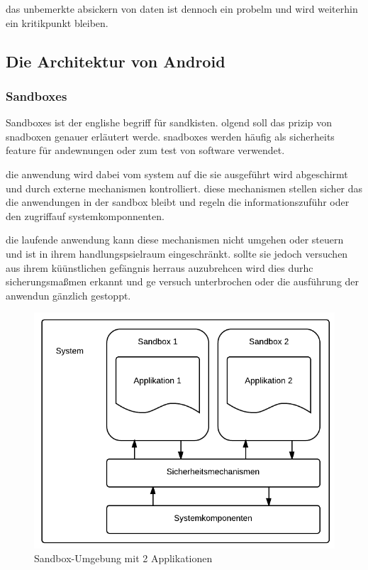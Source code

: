 das unbemerkte absickern von daten ist dennoch ein probelm und wird weiterhin ein kritikpunkt bleiben.


\subsection{Die Architektur von Android}
\subsubsection{Sandboxes}
\label{sandbox}
Sandboxes ist der englishe begriff für sandkisten. olgend soll das prizip von snadboxen genauer erläutert werde. snadboxes werden häufig als sicherheits feature für andewnungen oder zum test von software verwendet.

die anwendung wird dabei vom  system auf die sie ausgeführt wird abgeschirmt und durch externe mechanismen kontrolliert. diese mechanismen stellen sicher das die anwendungen in der sandbox bleibt und regeln die informationszuführ oder den zugriffauf systemkomponnenten.

die laufende anwendung kann diese mechanismen nicht umgehen oder steuern und ist in ihrem handlungspsielraum eingeschränkt. sollte sie jedoch versuchen aus ihrem küünstlichen gefängnis herraus auzubrehcen wird dies durhc sicherungsmaßmen erkannt und ge versuch unterbrochen oder die ausführung der anwendun gänzlich gestoppt.

\begin{center}
\begin{figure}
\includegraphics[scale=0.6]{images/sandbox}
\caption{Sandbox-Umgebung mit 2 Applikationen}
\label{sandbox}
\end{figure}
\end{center}

